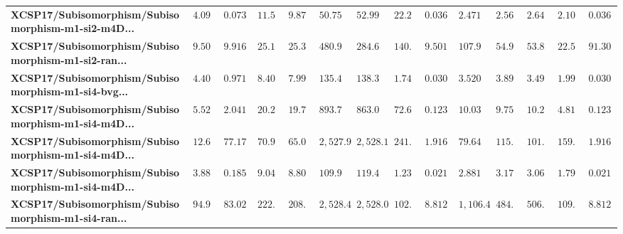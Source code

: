 \begin{tabular}{llllllllllllll}
\textbf{XCSP17/Subisomorphism/Subisomorphism-m1-si2-m4D...} &         $4.09359$ &   $0.073426$ &     $11.5016$ &       $9.87394$ &                                  $50.7585$ &                               $52.9981$ &            $22.247$ &  $0.036536$ &               $2.47162$ &               $2.56869$ &               $2.64328$ &               $2.10871$ &  $0.036536$ \\
\textbf{XCSP17/Subisomorphism/Subisomorphism-m1-si2-ran...} &         $9.50125$ &    $9.91633$ &     $25.1102$ &       $25.3397$ &                                  $480.903$ &                               $284.617$ &           $140.796$ &   $9.50125$ &               $107.939$ &               $54.9129$ &               $53.8362$ &               $22.5009$ &   $91.3038$ \\
\textbf{XCSP17/Subisomorphism/Subisomorphism-m1-si4-bvg...} &         $4.40895$ &   $0.971907$ &     $8.40141$ &       $7.99398$ &                                  $135.434$ &                               $138.349$ &           $1.74186$ &  $0.030151$ &               $3.52044$ &               $3.89937$ &               $3.49435$ &               $1.99075$ &  $0.030151$ \\
\textbf{XCSP17/Subisomorphism/Subisomorphism-m1-si4-m4D...} &         $5.52089$ &    $2.04147$ &     $20.2258$ &       $19.7603$ &                                  $893.799$ &                               $863.093$ &           $72.6672$ &  $0.123876$ &               $10.0366$ &               $9.75731$ &               $10.2675$ &               $4.81129$ &  $0.123876$ \\
\textbf{XCSP17/Subisomorphism/Subisomorphism-m1-si4-m4D...} &         $12.6339$ &    $77.1765$ &     $70.9664$ &       $65.0005$ &                                 $2,527.92$ &                              $2,528.17$ &           $241.382$ &   $1.91608$ &               $79.6457$ &               $115.536$ &               $101.281$ &               $159.641$ &   $1.91608$ \\
\textbf{XCSP17/Subisomorphism/Subisomorphism-m1-si4-m4D...} &         $3.88704$ &   $0.185454$ &     $9.04817$ &        $8.8063$ &                                  $109.921$ &                               $119.415$ &           $1.23865$ &  $0.021408$ &               $2.88151$ &               $3.17471$ &               $3.06256$ &               $1.79261$ &  $0.021408$ \\
\textbf{XCSP17/Subisomorphism/Subisomorphism-m1-si4-ran...} &         $94.9099$ &    $83.0271$ &     $222.527$ &       $208.252$ &                                 $2,528.46$ &                              $2,528.03$ &           $102.834$ &   $8.81267$ &              $1,106.46$ &               $484.839$ &               $506.545$ &               $109.912$ &   $8.81267$ \\

\end{tabular}
